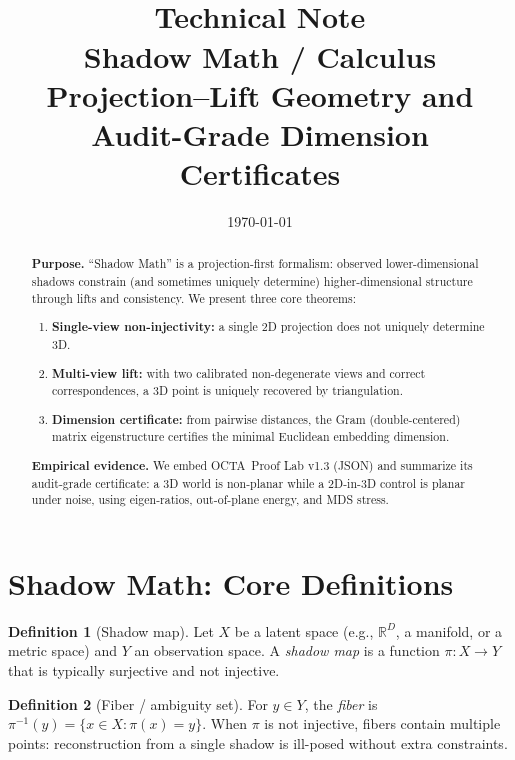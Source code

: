 \documentclass[11pt]{article}
\title{\vspace{-1.2em}
{\Huge \OCTAResearch}\\[-0.2em]
{\large \color{octaGray}Technical Note}\\[0.8em]
{\LARGE \textbf{Shadow Math / Calculus}}\\[-0.1em]
{\large \color{octaGray}Projection--Lift Geometry and Audit-Grade Dimension Certificates}\\[0.2em]
{\small \color{octaGray}\Tagline}
}
\author{\OCTAResearch}
\date{\today}
\newcommand{\OCTA}{\textsc{OCTA}}
\theoremstyle{definition}
\newtheorem{definition}{Definition}[section]
\theoremstyle{plain}
\theoremstyle{remark}
\begin{document}
\maketitle

\begin{abstract}
\textbf{Purpose.} ``Shadow Math'' is a projection-first formalism: observed lower-dimensional shadows constrain (and sometimes uniquely determine)
higher-dimensional structure through lifts and consistency. We present three core theorems:

\begin{enumerate}[label=(\Alph*)]
\item \textbf{Single-view non-injectivity:} a single 2D projection does not uniquely determine 3D.
\item \textbf{Multi-view lift:} with two calibrated non-degenerate views and correct correspondences, a 3D point is uniquely recovered by triangulation.
\item \textbf{Dimension certificate:} from pairwise distances, the Gram (double-centered) matrix eigenstructure certifies the minimal Euclidean embedding dimension.
\end{enumerate}

\textbf{Empirical evidence.} We embed \OCTA\ Proof Lab v1.3 (JSON) and summarize its audit-grade certificate:
a 3D world is non-planar while a 2D-in-3D control is planar under noise, using eigen-ratios, out-of-plane energy, and MDS stress.
\end{abstract}

\tableofcontents
\newpage

\section{Shadow Math: Core Definitions}

\begin{definition}[Shadow map]
Let $X$ be a latent space (e.g., $\mathbb{R}^D$, a manifold, or a metric space) and $Y$ an observation space.
A \emph{shadow map} is a function $\pi:X\to Y$ that is typically surjective and not injective.
\end{definition}

\begin{definition}[Fiber / ambiguity set]
For $y\in Y$, the \emph{fiber} is $\pi^{-1}(y)=\{x\in X:\pi(x)=y\}$.
When $\pi$ is not injective, fibers contain multiple points: reconstruction from a single shadow is ill-posed without extra constraints.
\end{definition}
\end{document}
